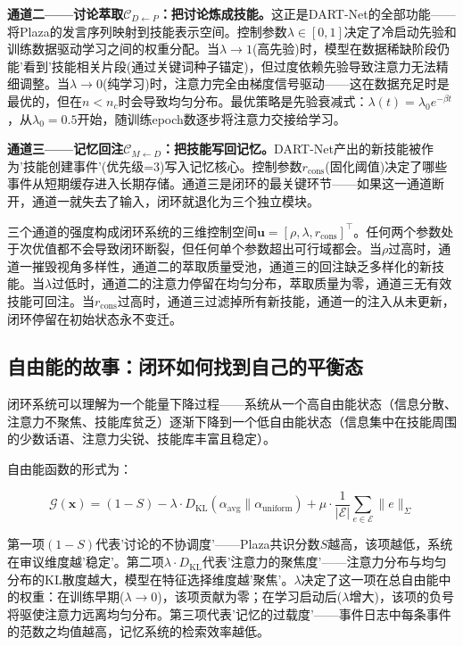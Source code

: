 \documentclass[twocolumn,10.5pt]{ctexart}
\def\cC{\mathcal{C}}
\def\cE{\mathcal{E}}
\def\cG{\mathcal{G}}
\begin{document}
\textbf{通道二——讨论萃取$\cC_{D \leftarrow P}$：把讨论炼成技能。}这正是DART-Net的全部功能——将Plaza的发言序列映射到技能表示空间。控制参数$\lambda \in [0,1]$决定了冷启动先验和训练数据驱动学习之间的权重分配。当$\lambda \to 1$(高先验)时，模型在数据稀缺阶段仍能'看到'技能相关片段(通过关键词种子锚定)，但过度依赖先验导致注意力无法精细调整。当$\lambda \to 0$(纯学习)时，注意力完全由梯度信号驱动——这在数据充足时是最优的，但在$n < n_c$时会导致均匀分布。最优策略是先验衰减式：$\lambda(t) = \lambda_0 e^{-\beta t}$，从$\lambda_0 = 0.5$开始，随训练epoch数逐步将注意力交接给学习。

\textbf{通道三——记忆回注$\cC_{M \leftarrow D}$：把技能写回记忆。}DART-Net产出的新技能被作为'技能创建事件'(优先级=3)写入记忆核心。控制参数$r_{\text{cons}}$(固化阈值)决定了哪些事件从短期缓存进入长期存储。通道三是闭环的最关键环节——如果这一通道断开，通道一就失去了输入，闭环就退化为三个独立模块。

三个通道的强度构成闭环系统的三维控制空间$\mathbf{u} = [\rho, \lambda, r_{\text{cons}}]^\top$。任何两个参数处于次优值都不会导致闭环断裂，但任何单个参数超出可行域都会。当$\rho$过高时，通道一摧毁视角多样性，通道二的萃取质量受池，通道三的回注缺乏多样化的新技能。当$\lambda$过低时，通道二的注意力停留在均匀分布，萃取质量为零，通道三无有效技能可回注。当$r_{\text{cons}}$过高时，通道三过滤掉所有新技能，通道一的注入从未更新，闭环停留在初始状态永不变迁。

\subsection{自由能的故事：闭环如何找到自己的平衡态}

闭环系统可以理解为一个能量下降过程——系统从一个高自由能状态（信息分散、注意力不聚焦、技能库贫乏）逐渐下降到一个低自由能状态（信息集中在技能周围的少数话语、注意力尖锐、技能库丰富且稳定）。

自由能函数的形式为：

\begin{equation}
\cG(\mathbf{x}) = (1 - S) - \lambda \cdot D_{\text{KL}}(\alpha_{\text{avg}} \parallel \alpha_{\text{uniform}}) + \mu \cdot \frac{1}{|\cE|}\sum_{e\in \cE} \|e\|_\Sigma
\label{eq:free_energy}
\end{equation}

第一项$(1-S)$代表'讨论的不协调度'——Plaza共识分数$S$越高，该项越低，系统在审议维度越'稳定'。第二项$\lambda \cdot D_{\text{KL}}$代表'注意力的聚焦度'——注意力分布与均匀分布的KL散度越大，模型在特征选择维度越'聚焦'。$\lambda$决定了这一项在总自由能中的权重：在训练早期($\lambda \to 0$)，该项贡献为零；在学习启动后($\lambda$增大)，该项的负号将驱使注意力远离均匀分布。第三项代表'记忆的过载度'——事件日志中每条事件的范数之均值越高，记忆系统的检索效率越低。
\end{document}
